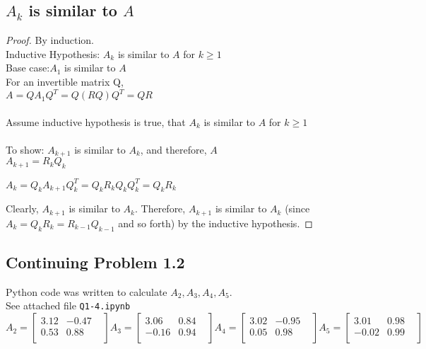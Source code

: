 \documentclass[12pt]{article}
\begin{document}
\subsection{$A_k$ is similar to $A$}
\begin{proof} By induction. \\
Inductive Hypothesis: $A_k$ is similar to $A$ for $k \geq 1$ \\
Base case:$A_1$ is similar to $A$ \\
For an invertible matrix Q, \\
$A = QA_{1}Q^T = Q (RQ) Q^T = QR$ \\ \\
Assume inductive hypothesis is true, that $A_k$ is similar to $A$ for $k \geq 1$ \\ \\
To show: $A_{k+1}$ is similar to $A_k$, and therefore, $A$ \\

$A_{k+1} = R_kQ_k$ 

$A_k = Q_k A_{k+1} Q_k^T  =  Q_k R_kQ_k Q_k^T = Q_k R_k$

Clearly, $A_{k+1}$ is similar to $A_k$. Therefore, $A_{k+1}$ is similar to $A_k$ (since $A_k = Q_kR_k = R_{k-1}Q_{k-1}$ and so forth) by the inductive hypothesis.

\end{proof}

\subsection{Continuing Problem  1.2}
Python code was written to calculate $A_2, A_3, A_4, A_5$. \\
See attached file \texttt{Q1-4.ipynb}
\\
$$
A_2 = \begin{bmatrix}
3.12 & -0.47 & \\
0.53 & 0.88 & \\
\end{bmatrix}
A_3 = \begin{bmatrix}
3.06 & 0.84 & \\
-0.16 & 0.94 & \\
\end{bmatrix}
A_4 = \begin{bmatrix}
3.02 & -0.95 & \\
0.05 & 0.98 & \\
\end{bmatrix}
A_5 = \begin{bmatrix}
3.01 & 0.98 & \\
-0.02 & 0.99 & \\
\end{bmatrix}
$$ \\ 
\end{document}
